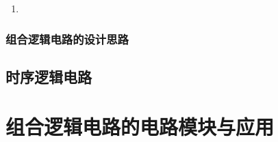 \documentclass[UTF8]{article}
\begin{document}
\begin{enumerate}
    \item 
\end{enumerate}

\subsubsection{组合逻辑电路的设计思路}

\subsection{时序逻辑电路}


\section{组合逻辑电路的电路模块与应用}
\end{document}
